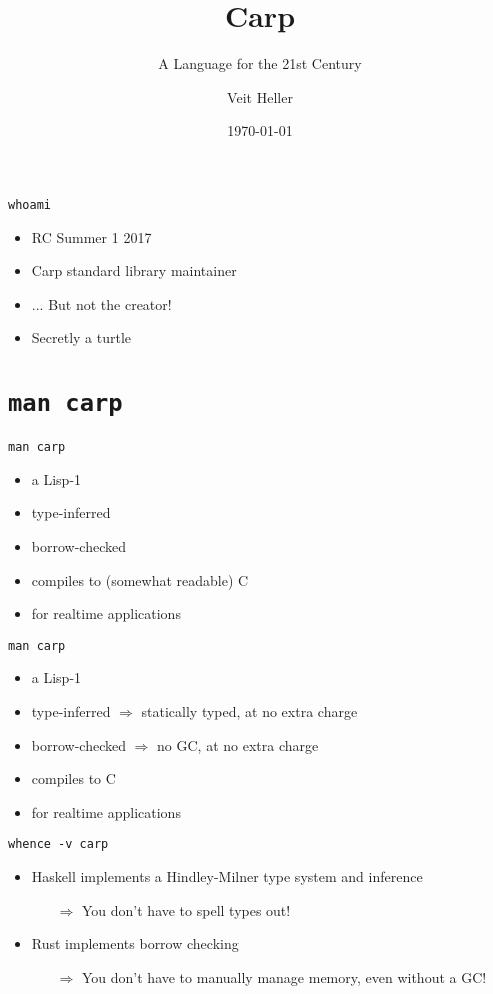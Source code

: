 \documentclass[aspectratio=169]{beamer}
\title{Carp}
\subtitle{A Language for the 21st Century}
\date{\today}
\author{Veit Heller}
\institute{Localhost | Recurse Center}
\begin{document}
  \maketitle
  \begin{frame}{\texttt{whoami}}
    \begin{itemize}
      \item RC Summer 1 2017
      \item Carp standard library maintainer
      \item ... But not the creator!
      \item Secretly a turtle
    \end{itemize}
  \end{frame}
  \section{\texttt{man carp}}
  \begin{frame}{\texttt{man carp}}
    \begin{itemize}
      \item a Lisp-1
      \item type-inferred
      \item borrow-checked
      \item compiles to (somewhat readable) C
      \item for realtime applications
    \end{itemize}
  \end{frame}
  \begin{frame}{\texttt{man carp}}
    \begin{itemize}
      \item a Lisp-1
      \item type-inferred $\Rightarrow$ statically typed, at no extra charge
      \item borrow-checked $\Rightarrow$ no GC, at no extra charge
      \item compiles to C
      \item for realtime applications
    \end{itemize}
  \end{frame}
  \begin{frame}{\texttt{whence -v carp}}
    \begin{itemize}
      \item Haskell implements a Hindley-Milner type system and inference
      \begin{itemize}
        \item[$\Rightarrow$] You don’t have to spell types out!
      \end{itemize}
      \item Rust implements borrow checking
      \begin{itemize}
        \item[$\Rightarrow$] You don’t have to manually manage memory, even without a GC!
      \end{itemize}
    \end{itemize}
  \end{frame}
\end{document}
